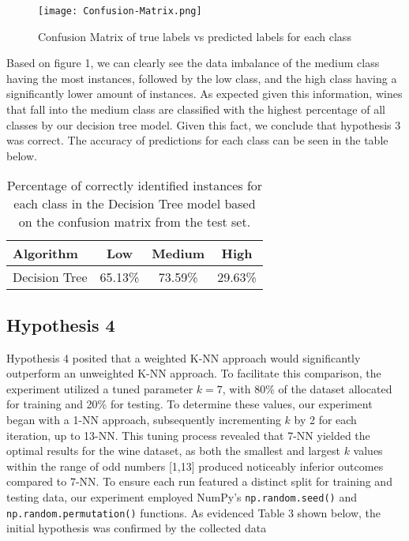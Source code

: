\documentclass{article}
\theoremstyle{plain}
\theoremstyle{definition}
\theoremstyle{remark}
\begin{document}
\begin{figure}[H]
    \centering
    \texttt{[image: Confusion-Matrix.png]}
    \caption{Confusion Matrix of true labels vs predicted labels for each class}
\end{figure}

Based on figure 1, we can clearly see the data imbalance of the medium class having the most instances, followed by the low class, and the high class having a significantly lower amount of instances. As expected given this information, wines that fall into the medium class are classified with the highest percentage of all classes by our decision tree model. Given this fact, we conclude that hypothesis 3 was correct. The accuracy of predictions for each class can be seen in the table below.


\begin{table}[H]
\centering
\begin{tabular}{lccc}
\toprule
Algorithm & Low & Medium & High \\
\midrule
Decision Tree & 65.13\% & 73.59\% & 29.63\% \\
\bottomrule
\end{tabular}
\caption{Percentage of correctly identified instances for each class in the Decision Tree model based on the confusion matrix from the test set.}
\end{table}


\subsection{Hypothesis 4}
Hypothesis 4 posited that a weighted K-NN approach would significantly outperform an unweighted K-NN approach. To facilitate this comparison, the experiment utilized a tuned parameter \( k = 7 \), with 80\% of the dataset allocated for training and 20\% for testing. To determine these values, our experiment began with a 1-NN approach, subsequently incrementing \( k \) by 2 for each iteration, up to 13-NN. This tuning process revealed that 7-NN yielded the optimal results for the wine dataset, as both the smallest and largest \( k \) values within the range of odd numbers [1,13] produced noticeably inferior outcomes compared to 7-NN. To ensure each run featured a distinct split for training and testing data, our experiment employed NumPy's \texttt{np.random.seed()} and \texttt{np.random.permutation()} functions. As evidenced Table 3 shown below, the initial hypothesis was confirmed by the collected data
\end{document}
